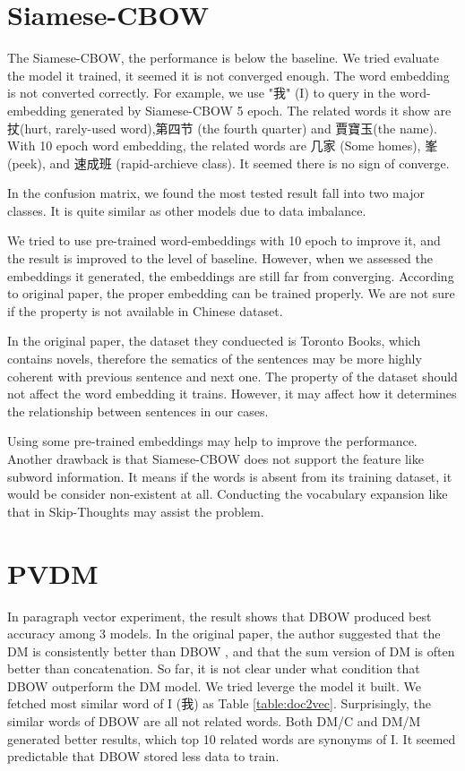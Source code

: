 \section{Siamese-CBOW}

The Siamese-CBOW, the performance is below the baseline. We tried evaluate the model it trained, it seemed it is not converged enough. 
The word embedding is not converted correctly. For example, we use "我" (I) to query in the word-embedding generated by Siamese-CBOW 5 epoch. 
The related words it show are 扙(hurt, rarely-used word),第四节 (the fourth quarter) and 賈寶玉(the name). With 10 epoch word embedding, the  
related words are 几家 (Some homes), 峯(peek), and 速成班 (rapid-archieve class). It seemed there is no sign of converge.

In the confusion matrix, we found the most tested result fall into two major classes.
It is quite similar as other models due to data imbalance.

We tried to use pre-trained word-embeddings with 10 epoch to improve it, and the result is improved to the level of baseline.
However, when we assessed the embeddings it generated, the embeddings are still far from converging. 
According to original paper, the proper embedding can be trained properly. 
We are not sure if the property is not available in Chinese dataset.

In the original paper, the dataset they conduected is Toronto Books, which contains novels,
 therefore the sematics of the sentences may be more highly coherent with previous sentence and next one. 
The property of the dataset should not affect the word embedding it trains. 
However, it may affect how it determines the relationship between sentences in our cases.

Using some pre-trained embeddings may help to improve the performance. 
Another drawback is that Siamese-CBOW does not support the feature like subword information.
It means if the words is absent from its training dataset, it would be consider non-existent at all. Conducting the vocabulary expansion like that in Skip-Thoughts may assist the problem.


\section{PVDM}

In paragraph vector experiment, the result shows that DBOW produced best accuracy among 3 models. In the original paper, the author suggested that the DM is consistently better than DBOW
, and that the sum version of DM is often better than concatenation. 
So far, it is not clear under what condition that DBOW outperform the DM model. We tried leverge the model it built. 
We fetched most similar word of I (我) as Table \ref{table:doc2vec}. Surprisingly, the similar words of DBOW are all not related words. 
Both DM/C and DM/M generated better results, which top 10 related words are synonyms of I.
It seemed predictable that DBOW stored less data to train.

